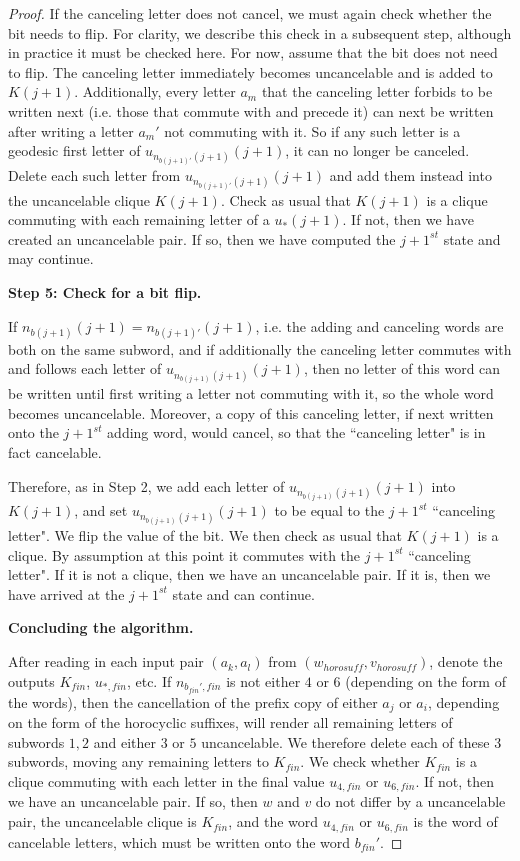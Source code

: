 \documentclass[10pt,a4paper]{amsart}
\theoremstyle{definition}
\theoremstyle{remark}
\begin{document}
\begin{proof}
		If the canceling letter does not cancel, we must again check whether the bit needs to flip. For clarity, we describe this check in a subsequent step, although in practice it must be checked here. For now, assume that the bit does not need to flip. The canceling letter immediately becomes uncancelable and is added to $K(j+1)$. Additionally, every letter $a_m$ that the canceling letter forbids to be written next (i.e. those that commute with and precede it) can next be written after writing a letter $a_m'$ not commuting with it. So if any such letter is a geodesic first letter of $u_{n_{b(j+1)'}(j+1)}(j+1)$, it can no longer be canceled. Delete each such letter from $u_{n_{b(j+1)'}(j+1)}(j+1)$ and add them instead into the uncancelable clique $K(j+1)$. Check as usual that $K(j+1)$ is a clique commuting with each remaining letter of a $u_{*}(j+1)$. If not, then we have created an uncancelable pair. If so, then we have computed the $j+1^{st}$ state and may continue.
		
		\textbf{Step 5: Check for a bit flip.}
		
		If $n_{b(j+1)}(j+1) = n_{b(j+1)'}(j+1)$, i.e. the adding and canceling words are both on the same subword, and if additionally the canceling letter commutes with and follows each letter of $u_{n_{b(j+1)}(j+1)}(j+1)$, then no letter of this word can be written until first writing a letter not commuting with it, so the whole word becomes uncancelable. Moreover, a copy of this canceling letter, if next written onto the $j+1^{st}$ adding word, would cancel, so that the ``canceling letter" is in fact cancelable.
		
		Therefore, as in Step 2, we add each letter of $u_{n_{b(j+1)}(j+1)}(j+1)$ into $K(j+1)$, and set $u_{n_{b(j+1)}(j+1)}(j+1)$ to be equal to the $j+1^{st}$ ``canceling letter". We flip the value of the bit. We then check as usual that $K(j+1)$ is a clique. By assumption at this point it commutes with the $j+1^{st}$ ``canceling letter". If it is not a clique, then we have an uncancelable pair. If it is, then we have arrived at the $j+1^{st}$ state and can continue. 
		
		\textbf{Concluding the algorithm.}
		
		After reading in each input pair $(a_k, a_l)$ from $(w_{horosuff}, v_{horosuff})$, denote the outputs $K_{fin}$, $u_{*, fin}$, etc. If $n_{b_{fin}', fin}$ is not either $4$ or $6$ (depending on the form of the words), then the cancellation of the prefix copy of either $a_j$ or $a_i$, depending on the form of the horocyclic suffixes, will render all remaining letters of subwords $1, 2$ and either $3$ or $5$ uncancelable. We therefore delete each of these $3$ subwords, moving any remaining letters to $K_{fin}$. We check whether $K_{fin}$ is a clique commuting with each letter in the final value $u_{4, fin}$ or $u_{6, fin}$. If not, then we have an uncancelable pair. If so, then $w$ and $v$ do not differ by a uncancelable pair, the uncancelable clique is $K_{fin}$, and the word $u_{4, fin}$ or $u_{6, fin}$ is the word of cancelable letters, which must be written onto the word $b_{fin}'$.
	\end{proof}
\end{document}
